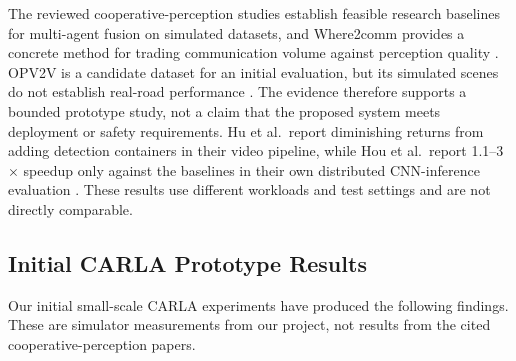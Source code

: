 \documentclass[12pt,a4paper,oneside]{report}
\begin{document}
The reviewed cooperative-perception studies establish feasible research
baselines for multi-agent fusion on simulated datasets, and Where2comm
provides a concrete method for trading communication volume against
perception quality \cite{v2xvit2022,where2comm2022,cobevt2023}. OPV2V is a
candidate dataset for an initial evaluation, but its simulated scenes do
not establish real-road performance \cite{opv2v2022}. The evidence therefore
supports a bounded prototype study, not a claim that the proposed system
meets deployment or safety requirements. Hu et al.\ report diminishing
returns from adding detection containers in their video pipeline, while
Hou et al.\ report 1.1--3$\times$ speedup only against the baselines in
their own distributed CNN-inference evaluation \cite{hu2023,hou2022}.
These results use different workloads and test settings and are not
directly comparable.

\subsection{Initial CARLA Prototype Results}
\label{subsec:carla-results}

Our initial small-scale CARLA experiments have produced the following
findings. These are simulator measurements from our project, not results
from the cited cooperative-perception papers.
\end{document}
